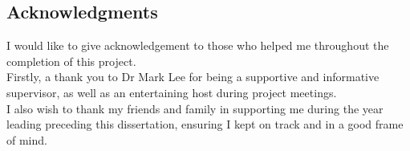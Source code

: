 \documentclass{article}
\begin{document}

\tableofcontents
\listoffigures
\listoftables
\pagebreak


\begin{center}\section*{Acknowledgments}\end{center}
I would like to give acknowledgement to those who helped me throughout the completion of this project.\\

Firstly, a thank you to Dr Mark Lee for being a supportive and informative supervisor, as well as an entertaining host during project meetings. \\

I also wish to thank my friends and family in supporting me during the year leading preceding this dissertation, ensuring I kept on track and in a good frame of mind.\\

\pagebreak













\pagebreak
{}

\nocite{*}

\end{document}
